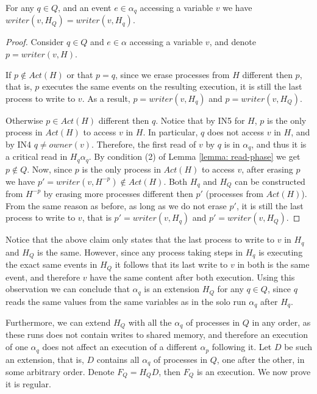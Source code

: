 \begin{claim-subsection} \label{claim:Q-same-writer}
	For any $q \in Q$, and an event $e \in \alpha_q$ accessing a variable $v$ we have $writer(v,H_Q) = writer(v,H_q)$.
\end{claim-subsection}

\begin{proof}
	Consider $q \in Q$ and $e \in \alpha$ accessing a variable $v$, and denote $p = writer(v,H)$.
	
	If $p \notin Act(H)$ or that $p = q$, since we erase processes from $H$ different then $p$, that is, $p$ executes the same events on the resulting execution, it is still the last process to write to $v$. As a result, $p = writer(v,H_q)$ and $p = writer(v,H_Q)$.
	
	Otherwise $p \in Act(H)$ different then $q$. Notice that by IN5 for $H$, $p$ is the only process in $Act(H)$ to access $v$ in $H$. In particular, $q$ does not access $v$ in $H$, and by IN4 $q \neq owner(v)$. Therefore, the first read of $v$ by $q$ is in $\alpha_q$, and thus it is a critical read in $H_q \alpha_q$. By condition (2) of Lemma \ref{lemma: read-phase} we get $p \notin Q$. Now, since $p$ is the only process in $Act(H)$ to access $v$, after erasing $p$ we have $p' = writer(v,H^{-p}) \notin Act(H)$. Both $H_q$ and $H_Q$ can be constructed from $H^{-p}$ by erasing more processes different then $p'$ (processes from $Act(H)$). From the same reason as before, as long as we do not erase $p'$, it is still the last process to write to $v$, that is $p' = writer(v,H_q)$ and $p' = writer(v,H_Q)$.
\end{proof}

Notice that the above claim only states that the last process to write to $v$ in $H_q$ and $H_Q$ is the same. However, since any process taking steps in $H_q$ is executing the exact same events in $H_Q$ it follows that its last write to $v$ in both is the same event, and therefore $v$ have the same content after both execution. Using this observation we can conclude that $\alpha_q$ is an extension $H_Q$ for any $q \in Q$, since $q$ reads the same values from the same variables as in the solo run $\alpha_q$ after $H_q$.

Furthermore, we can extend $H_Q$ with all the $\alpha_q$ of processes in $Q$ in any order, as these runs does not contain writes to shared memory, and therefore an execution of one $\alpha_q$ does not affect an execution of a different $\alpha_p$ following it. Let $D$ be such an extension, that is, $D$ contains all $\alpha_q$ of processes in $Q$, one after the other, in some arbitrary order. Denote $F_Q = H_Q D$, then $F_Q$ is an execution. We now prove it is regular.

